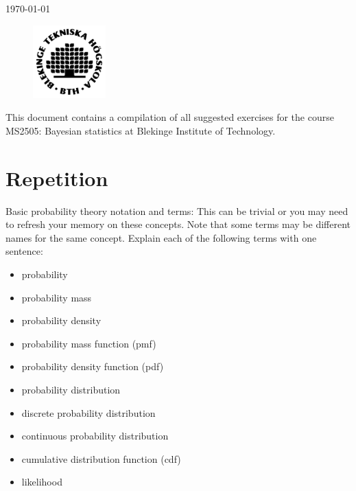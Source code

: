 \documentclass[12pt,a4paper,twoside]{article}
\begin{document}
\vspace*{3cm}

\begin{center}
    \Huge\textbf{\doctitle}\\
    \Large\textbf{\docsubtitle}
    \\\vspace*{5mm} 
    \large\today                            
\end{center} 

\vspace*{5mm}

\begin{figure}[!b]
    \centering
    \includegraphics[width = 0.25\textwidth]{../Project/figures/BTH_logo_black.png}
\end{figure}

\newpage

This document contains a compilation of all suggested exercises for the course MS2505: Bayesian
statistics at Blekinge Institute of Technology\cite{TheCourse}.

\newpage
\section{Repetition}
Basic probability theory notation and terms: This can be trivial or you may need to refresh your memory on these
concepts. Note that some terms may be different names for the same concept. Explain each of the following terms with
one sentence:
\begin{itemize}
    \item probability
    \item probability mass
    \item probability density
    \item probability mass function (pmf)
    \item probability density function (pdf)
    \item probability distribution
    \item discrete probability distribution
    \item continuous probability distribution
    \item cumulative distribution function (cdf)
    \item likelihood
\end{itemize}
\end{document}
